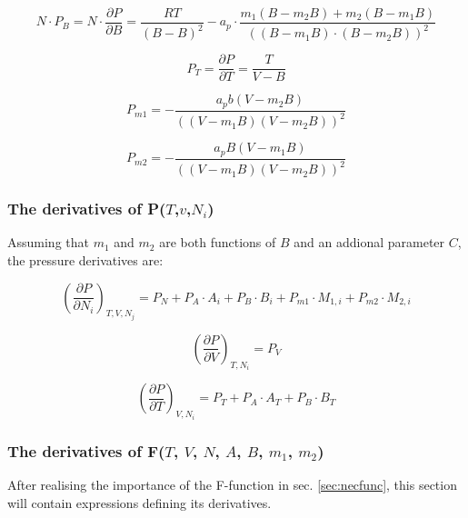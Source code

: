 \documentclass[a4paper, 12pt, english, sintefheadings, sintefcolour]{sintefmemo}
\begin{document}
\begin{equation}
N\cdot P_B=N\cdot \frac{\partial P}{\partial B}=\frac{RT}{\left(B-B\right)^2}-a_p\cdot\frac{m_1\left(B-m_2B\right)+m_2\left(B-m_1B\right)}{\left((B-m_1B)\cdot(B-m_2B)\right)^2}
\end{equation}

\noindent\hrulefill

\begin{equation}
P_T=\frac{\partial P}{\partial T}=\frac{T}{V-B}
\end{equation}

\noindent\hrulefill

\begin{equation}
P_{m1}=-\frac{a_pb\left(V-m_2B\right)}{\left((V-m_1B)(V-m_2B)\right)^2}
\end{equation}

\noindent\hrulefill

\begin{equation}
P_{m2}=-\frac{a_pB\left(V-m_1B\right)}{\left((V-m_1B)(V-m_2B)\right)^2}
\end{equation}

\noindent\hrulefill

\subsubsection{The derivatives of P($T$,$v$,$N_i$)}
Assuming that $m_1$ and $m_2$ are both functions of $B$ and an addional
parameter $C$, the pressure derivatives are:

\noindent\hrulefill

\begin{equation}
\left(\frac{\partial P}{\partial N_i}\right)_{T,V,N_j}=P_N+P_A\cdot A_i+P_B\cdot B_i + P_{m1}\cdot M_{1,i}+P_{m2}\cdot M_{2,i}
\end{equation}

\noindent\hrulefill

\begin{equation}
\left(\frac{\partial P}{\partial V}\right)_{T,N_i}=P_V
\end{equation}

\noindent\hrulefill

\begin{equation}
\left(\frac{\partial P}{\partial T}\right)_{V,N_i}=P_T+P_A\cdot A_T+P_B\cdot B_T
\end{equation}

\noindent\hrulefill


\subsubsection{The derivatives of F($T$, $V$, $N$, $A$, $B$, $m_1$, $m_2$)}
After realising the importance of the F-function in sec. \ref{sec:necfunc}, this section will contain expressions defining its derivatives. \\
\end{document}
